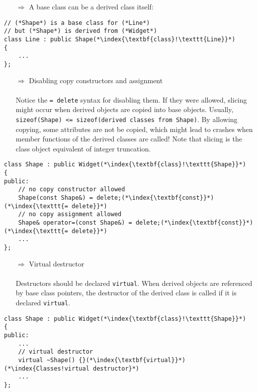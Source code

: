 \documentclass[10pt]{article}
\begin{document}
\begin{enumerate}
\item[$\Rightarrow$] A base class can be a derived class itself:
\end{enumerate}
\begin{lstlisting}
// (*Shape*) is a base class for (*Line*)
// but (*Shape*) is derived from (*Widget*)
class Line : public Shape(*\index{\textbf{class}!\texttt{Line}}*)
{
    ...
};
\end{lstlisting}
\begin{enumerate}
\item[$\Rightarrow$] Disabling copy constructors and assignment\\ \\ Notice the \texttt{= delete} syntax for disabling them. If they were allowed, slicing might occur when derived objects are copied into base objects. Usually, \texttt{sizeof(Shape) <= sizeof(derived classes from Shape)}. By allowing copying, some attributes are not be copied, which might lead to crashes when member functions of the derived classes are called! Note that slicing is the class object equivalent of integer truncation.
\end{enumerate}
\begin{lstlisting}
class Shape : public Widget(*\index{\textbf{class}!\texttt{Shape}}*)
{
public:
    // no copy constructor allowed
    Shape(const Shape&) = delete;(*\index{\textbf{const}}*)(*\index{\texttt{= delete}}*)
    // no copy assignment allowed
    Shape& operator=(const Shape&) = delete;(*\index{\textbf{const}}*)(*\index{\texttt{= delete}}*)
    ...
};
\end{lstlisting}
\begin{enumerate}
\item[$\Rightarrow$] Virtual destructor\\ \\ Destructors should be declared \texttt{virtual}. When derived
objects are referenced by base class pointers, the destructor of the derived class is called if it is declared \texttt{virtual}.
\end{enumerate}
\begin{lstlisting}
class Shape : public Widget(*\index{\textbf{class}!\texttt{Shape}}*)
{
public:
    ...
    // virtual destructor
    virtual ~Shape() {}(*\index{\textbf{virtual}}*)(*\index{Classes!virtual destructor}*)
    ...
};
\end{lstlisting}
\end{document}
